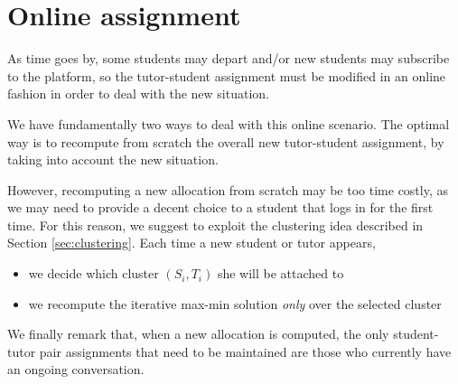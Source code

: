 \documentclass[11pt,oneside,a4paper]{article}     %
\begin{document}
\section{Online assignment}

As time goes by, some students may depart and/or new students may subscribe to the platform, so the tutor-student assignment must be modified in an online fashion in order to deal with the new situation.

We have fundamentally two ways to deal with this online scenario.
The optimal way is to recompute from scratch the overall new tutor-student assignment, by taking into account the new situation. 

However, recomputing a new allocation from scratch may be too time costly, as we may need to provide a decent choice to a student that logs in for the first time. For this reason, we suggest to exploit the clustering idea described in Section \ref{sec:clustering}. Each time a new student or tutor appears,

\begin{itemize}
\item we decide which cluster $(S_i,T_i)$ she will be attached to
\item we recompute the iterative max-min solution \emph{only} over the selected cluster
\end{itemize}

We finally remark that, when a new allocation is computed, the only student-tutor pair assignments that need to be maintained are those who currently have an ongoing conversation.






\end{document}
